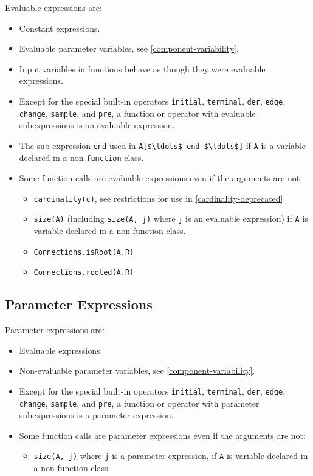 Evaluable expressions are:
\begin{itemize}
\item
  Constant expressions.
\item
  Evaluable parameter variables, see \cref{component-variability}.
\item
  Input variables in functions behave as though they were evaluable expressions.
\item
  Except for the special built-in operators \lstinline!initial!, \lstinline!terminal!, \lstinline!der!, \lstinline!edge!, \lstinline!change!, \lstinline!sample!, and \lstinline!pre!, a function or operator with evaluable subexpressions is an evaluable expression.
\item
  The sub-expression \lstinline!end! used in \lstinline!A[$\ldots$ end $\ldots$]! if \lstinline!A! is a variable declared in a non-\lstinline!function! class.
\item
  Some function calls are evaluable expressions even if the arguments are not:
  \begin{itemize}
  \item
    \lstinline!cardinality(c)!, see restrictions for use in \cref{cardinality-deprecated}.
  \item
    \lstinline!size(A)! (including \lstinline!size(A, j)! where \lstinline!j! is an evaluable expression) if \lstinline!A! is variable declared in a non-function class.
  \item
    \lstinline!Connections.isRoot(A.R)!
  \item
    \lstinline!Connections.rooted(A.R)!
  \end{itemize}
\end{itemize}

\subsection{Parameter Expressions}\label{parameter-expressions}

Parameter expressions are:
\begin{itemize}
\item
  Evaluable expressions.
\item
  Non-evaluable parameter variables, see \cref{component-variability}.
\item
  Except for the special built-in operators \lstinline!initial!, \lstinline!terminal!, \lstinline!der!,
  \lstinline!edge!, \lstinline!change!, \lstinline!sample!, and \lstinline!pre!, a function or operator with parameter
  subexpressions is a parameter expression.
\item
  Some function calls are parameter expressions even if the arguments are not:
  \begin{itemize}
  \item
    \lstinline!size(A, j)! where \lstinline!j! is a parameter expression, if \lstinline!A! is variable declared in a non-function class.
  \end{itemize}
\end{itemize}

